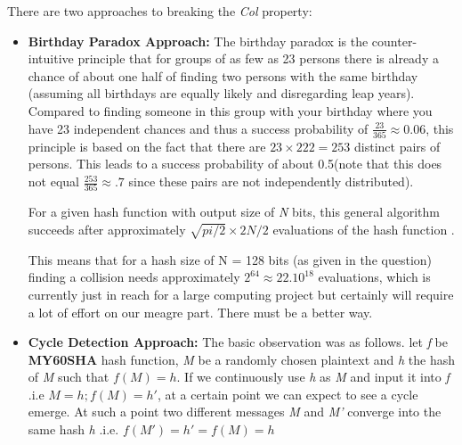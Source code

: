 \documentclass[10pt,a4paper,oneside]{article}
\begin{document}
There are two approaches to breaking the \textit{Col} property:
\begin{itemize}
\item \textbf{Birthday Paradox Approach:} The birthday paradox is the counter-intuitive principle that for groups of as few as 23 persons there is already a chance of about one half of finding two persons with the same birthday (assuming all birthdays are equally likely and disregarding leap years). Compared to finding someone in this group with your birthday where you have 23 independent chances and thus a success probability of \( \frac{23}{365}  \approx 0.06 \), this principle is based on the fact that there are \( 23 \times 222= 253 \) distinct pairs of persons. This leads to a success probability of about 0.5(note that this does not equal \( \frac{253}{365} \approx .7 \) since these pairs are not independently distributed). \par
For a given hash function with output size of \textit{N} bits, this general algorithm succeeds after approximately \( \sqrt{pi/2} \times 2N/2 \) evaluations of the hash function \cite{vanOorschot1999}. \par
This means that for a hash size of N = 128 bits (as given in the question) finding a collision needs approximately \( 2^{64} \approx 22. 10^{18} \) evaluations, which is currently just in reach for a large computing project but certainly will require a lot of effort on our meagre part. There must be a better way.

\item \textbf{Cycle Detection Approach:} The basic observation was as follows.
let \textit{f} be \textbf{MY60SHA} hash function, \textit{M} be a randomly chosen plaintext and \textit{h} the hash of \textit{M} such that \( f(M) = h  \). If we continuously use \textit{h} as \textit{M} and input it into \textit{f} .i.e \( M = h; f(M) = h' \), at a certain point we can expect to see a cycle emerge. At such a point two different messages \textit{M} and \textit{M'} converge into the same hash \textit{h} .i.e. \( f(M') = h' = f(M) = h \)\par


\end{itemize}
\end{document}
